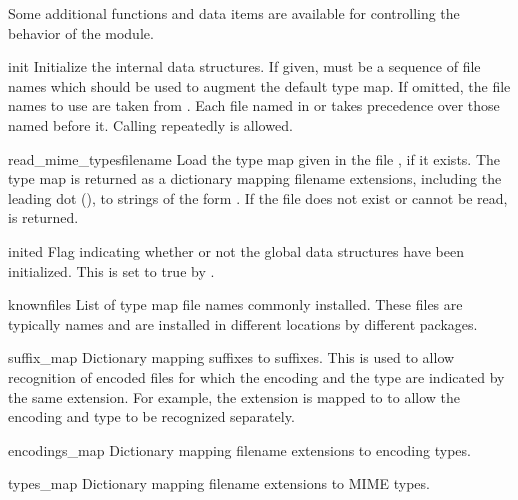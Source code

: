 Some additional functions and data items are available for controlling
the behavior of the module.


\begin{funcdesc}{init}{}
Initialize the internal data structures.  If given,  must
be a sequence of file names which should be used to augment the
default type map.  If omitted, the file names to use are taken from
.  Each file named in  or
 takes precedence over those named before it.
Calling  repeatedly is allowed.
\end{funcdesc}

\begin{funcdesc}{read_mime_types}{filename}
Load the type map given in the file , if it exists.  The 
type map is returned as a dictionary mapping filename extensions,
including the leading dot (), to strings of the form
.  If the file  does
not exist or cannot be read,  is returned.
\end{funcdesc}


\begin{datadesc}{inited}
Flag indicating whether or not the global data structures have been
initialized.  This is set to true by .
\end{datadesc}

\begin{datadesc}{knownfiles}
List of type map file names commonly installed.  These files are
typically names  and are installed in different
locations by different packages.%
\end{datadesc}

\begin{datadesc}{suffix_map}
Dictionary mapping suffixes to suffixes.  This is used to allow
recognition of encoded files for which the encoding and the type are
indicated by the same extension.  For example, the 
extension is mapped to  to allow the encoding and type
to be recognized separately.
\end{datadesc}

\begin{datadesc}{encodings_map}
Dictionary mapping filename extensions to encoding types.
\end{datadesc}

\begin{datadesc}{types_map}
Dictionary mapping filename extensions to MIME types.
\end{datadesc}
